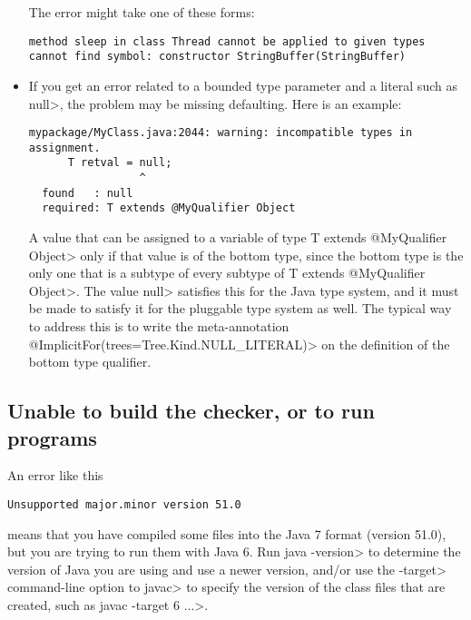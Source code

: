 \begin{itemize}
The error might take one of these forms:

\begin{Verbatim}
method sleep in class Thread cannot be applied to given types
cannot find symbol: constructor StringBuffer(StringBuffer)
\end{Verbatim}

\item
If you get an error related to a bounded type parameter and a literal such
as \<null>, the problem may be missing defaulting.  Here is an example:

\begin{Verbatim}
mypackage/MyClass.java:2044: warning: incompatible types in assignment.
      T retval = null;
                 ^
  found   : null
  required: T extends @MyQualifier Object
\end{Verbatim}

\noindent
A value that can be assigned to a variable of type \<T extends @MyQualifier
Object> only if that value is of the bottom type, since the bottom type is
the only one that is a subtype of every subtype of \<T extends @MyQualifier
Object>.  The value \<null> satisfies this for the Java type system, and it
must be made to satisfy it for the pluggable type system as well.  The
typical way to address this is to write the meta-annotation
\<@ImplicitFor(trees={Tree.Kind.NULL\_LITERAL})> on the definition of the
bottom type qualifier.

\end{itemize}


\subsection{Unable to build the checker, or to run programs\label{common-problems-running-java}}

An error like this

\begin{Verbatim}
Unsupported major.minor version 51.0
\end{Verbatim}

means that you have compiled some files into the Java 7 format (version
51.0), but you are trying to run them with Java 6.  Run \<java -version> to
determine the version of Java you are using and use a newer version,
and/or use the \<-target>
command-line option to \<javac> to specify the version of the class files
that are created, such as \<javac -target 6 ...>.




